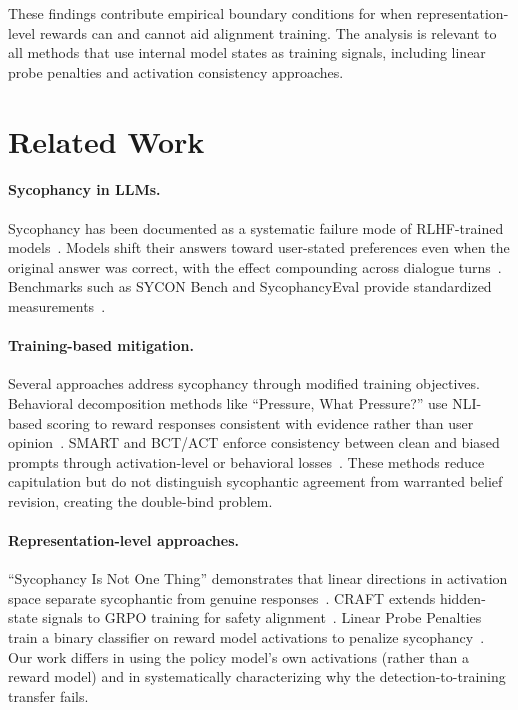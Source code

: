 \documentclass[11pt,a4paper]{article}
\begin{document}
These findings contribute empirical boundary conditions for when representation-level rewards can and cannot aid alignment training. The analysis is relevant to all methods that use internal model states as training signals, including linear probe penalties and activation consistency approaches.

\section{Related Work}

\paragraph{Sycophancy in LLMs.}
Sycophancy has been documented as a systematic failure mode of RLHF-trained models~\citep{perez2023discovering,sharma2024towards}. Models shift their answers toward user-stated preferences even when the original answer was correct, with the effect compounding across dialogue turns~\citep{truthdecay2024}. Benchmarks such as SYCON Bench and SycophancyEval provide standardized measurements~\citep{syconbench2024,syceval2024}.

\paragraph{Training-based mitigation.}
Several approaches address sycophancy through modified training objectives. Behavioral decomposition methods like ``Pressure, What Pressure?'' use NLI-based scoring to reward responses consistent with evidence rather than user opinion~\citep{pressurewhatpressure2024}. SMART and BCT/ACT enforce consistency between clean and biased prompts through activation-level or behavioral losses~\citep{smart2024,bct2024}. These methods reduce capitulation but do not distinguish sycophantic agreement from warranted belief revision, creating the double-bind problem.

\paragraph{Representation-level approaches.}
``Sycophancy Is Not One Thing'' demonstrates that linear directions in activation space separate sycophantic from genuine responses~\citep{sycnotone2024}. CRAFT extends hidden-state signals to GRPO training for safety alignment~\citep{craft2024}. Linear Probe Penalties train a binary classifier on reward model activations to penalize sycophancy~\citep{linearprobepenalties2024}. Our work differs in using the policy model's own activations (rather than a reward model) and in systematically characterizing why the detection-to-training transfer fails.
\end{document}
